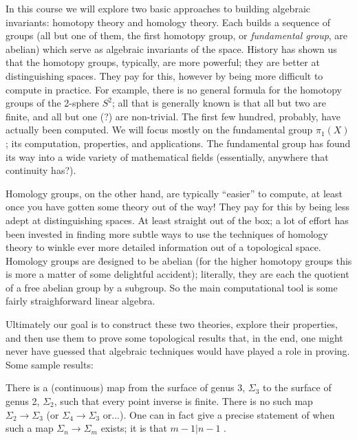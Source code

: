 \msk

In this course we will explore two basic approaches to building algebraic invariants:
homotopy theory and homology theory. Each builds a sequence of groups (all but one
of them, the first homotopy group, or {\it fundamental group}, are abelian) which
serve as algebraic invariants of the space. History has shown us that the homotopy
groups, typically, are more powerful; they are better at distinguishing spaces. They
pay for this, however by being more difficult to compute in practice. For example,
there is no general formula for the homotopy groups of the 2-sphere $S^2$; all
that is generally known is that all but two are finite, and all but one (?) are non-trivial.
The first few hundred, probably, have actually been computed. We will focus mostly on
the fundamental group $\pi_1(X)$; its computation, properties, and applications.
The fundamental group has found its way into a wide variety of mathematical fields
(essentially, anywhere that continuity has?).

Homology groups, on the other hand, are typically ``easier'' to compute, at least
once you have gotten some theory out of the way! They pay for this by being less
adept at distinguishing spaces. At least straight out of the box; a lot of effort
has been invested in finding more subtle ways to use the techniques of homology
theory to winkle ever more detailed information out of a topological space.
Homology groups are \u{designed} to be abelian (for the higher homotopy groups
this is more a matter of some delightful accident); literally, they are each
the quotient of a free abelian group by a subgroup. So the main computational 
tool is some fairly straighforward linear algebra. 

\bsk

Ultimately our goal is to construct these two theories, explore their properties, and 
then use them to prove some topological results that, in the end, one might never 
have guessed that algebraic techniques would have played a role in proving. Some
sample results:

\msk

There is a (continuous) map from the surface of genus 3, $\Sigma_3$ to the surface
of genus 2, $\Sigma_2$, such that every point inverse is finite. There is
no such map $\Sigma_2\rightarrow \Sigma_3$ (or $\Sigma_4\rightarrow \Sigma_3$ or...).
One can in fact give a precise statement of when such a map $\Sigma_n\rightarrow \Sigma_m$
exists; it is that $m-1|n-1$ .

\ssk


